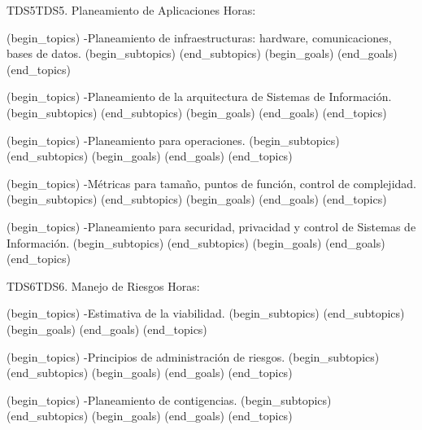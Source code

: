 \begin{BKL2}{TDS5}{TDS5. Planeamiento de Aplicaciones}
Horas:
 
(begin_topics)
-Planeamiento de infraestructuras: hardware, comunicaciones, bases de datos.
(begin_subtopics)
(end_subtopics)
(begin_goals)
(end_goals)
(end_topics)

 
(begin_topics)
-Planeamiento de la arquitectura de Sistemas de Información.
(begin_subtopics)
(end_subtopics)
(begin_goals)
(end_goals)
(end_topics)

 
(begin_topics)
-Planeamiento para operaciones.
(begin_subtopics)
(end_subtopics)
(begin_goals)
(end_goals)
(end_topics)

 
(begin_topics)
-Métricas para tamaño, puntos de función, control de complejidad.
(begin_subtopics)
(end_subtopics)
(begin_goals)
(end_goals)
(end_topics)

 
(begin_topics)
-Planeamiento para securidad, privacidad y control de Sistemas de Información.
(begin_subtopics)
(end_subtopics)
(begin_goals)
(end_goals)
(end_topics)

\end{BKL2}



\begin{BKL2}{TDS6}{TDS6. Manejo de Riesgos}
Horas:
 
(begin_topics)
-Estimativa de la viabilidad.
(begin_subtopics)
(end_subtopics)
(begin_goals)
(end_goals)
(end_topics)

 
(begin_topics)
-Principios de administración de riesgos.
(begin_subtopics)
(end_subtopics)
(begin_goals)
(end_goals)
(end_topics)

 
(begin_topics)
-Planeamiento de contigencias.
(begin_subtopics)
(end_subtopics)
(begin_goals)
(end_goals)
(end_topics)

\end{BKL2}



